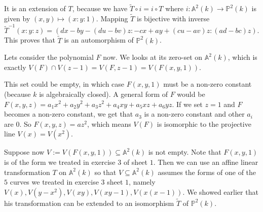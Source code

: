 \begin{exercise}{2}
\begin{enumerate}
\begin{equation*}
            \end{equation*}
            It is an extension of $T$, because we have $\widetilde{T} \circ i =
            i \circ T$ where $i \colon \mathbb{A}^2(k) \rightarrow
            \mathbb{P}^2(k)$ is given by $(x, y) \mapsto (x : y : 1)$.
            Mapping $\widetilde{T}$ is bijective with inverse
            \[
                \widetilde{T}^{-1}(x : y : z) = ( dx - by - (du - bv) z : - cx +
                ay + (cu - av)z : (ad - bc)z).
            \]
            This proves that $\widetilde{T}$ is an automorphism of
            $\mathbb{P}^2(k)$.

            Lets consider the polynomial $F$ now. We looks at its zero-set on
            $\mathbb{A}^2(k)$, which is exactly $V(F) \cap V(z - 1) = V(F, z - 1) = V(F(x, y, 1))$.

            This set could be empty, in which case $F(x, y, 1)$ must be a
            non-zero constant (because $k$ is algebraically closed). A general
            form of $F$ would be $F(x, y, z) = a_1 x^2 + a_2 y^2 + a_3 z^2 + a_4
            xy + a_5 xz + a_6 yz$. If we set $z = 1$ and $F$ becomes a non-zero
            constant, we get that $a_3$ is a non-zero constant and other $a_i$
            are $0$. So $F(x, y, z) = a z^2$, which means $V(F)$ is isomorphic
            to the projective line $V(x) = V(x^2)$.

            Suppose now $V := V(F(x, y, 1)) \subseteq \mathbb{A}^2(k)$ is not
            empty. Note that $F(x, y, 1)$ is of the form we treated in exercise
            $3$ of sheet $1$. Then we can use an affine linear transformation
            $T$ on $\mathbb{A}^2(k)$ so that $V \subseteq \mathbb{A}^2(k)$
            assumes the forms of one of the $5$ curves we treated in exercise
            $3$ sheet $1$, namely $V(x), V(y - x^2), V(xy), V(xy - 1), V(x(x -
            1))$. We showed earlier that his transformation can be extended to
            an isomorphism $\widetilde{T}$ of $\mathbb{P}^2(k)$.


\end{enumerate}
\end{exercise}
